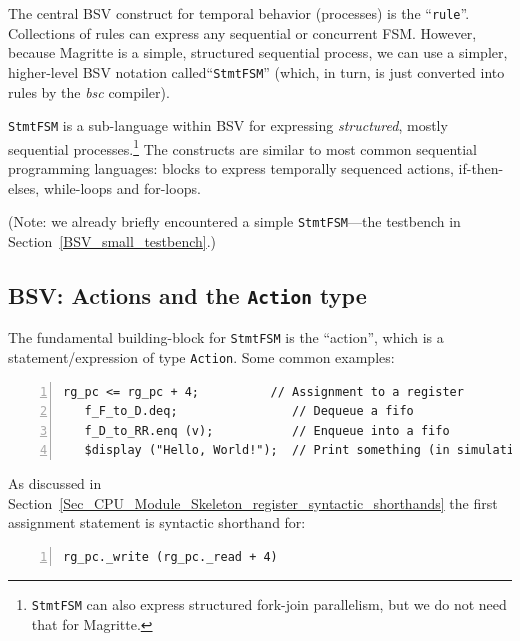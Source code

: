 \label{Sec_FSMs_StmtFSM}


The central BSV construct for temporal behavior (processes) is the
``\verb|rule|''.  Collections of rules can express any sequential or
concurrent FSM.  However, because Magritte is a simple, structured
sequential process, we can use a simpler, higher-level BSV notation
called``\verb|StmtFSM|'' (which, in turn, is just converted into rules
by the \emph{bsc} compiler).

\verb|StmtFSM| is a sub-language within BSV for expressing
\emph{structured}, mostly sequential processes.\footnote{{\tt StmtFSM}
can also express structured fork-join parallelism, but we do not need
that for Magritte.}  The constructs are similar to most common
sequential programming languages: blocks to express temporally
sequenced actions, if-then-elses, while-loops and for-loops.

(Note: we already briefly encountered a simple \verb|StmtFSM|---the
testbench in Section~\ref{BSV_small_testbench}.)


\subsection{BSV: Actions and the {\tt Action} type}


The fundamental building-block for \verb|StmtFSM| is the ``action'',
which is a statement/expression of type \verb|Action|.  Some common
examples:

\begin{Verbatim}[frame=single, numbers=left]
   rg_pc <= rg_pc + 4;          // Assignment to a register
   f_F_to_D.deq;                // Dequeue a fifo
   f_D_to_RR.enq (v);           // Enqueue into a fifo
   $display ("Hello, World!");  // Print something (in simulation only)
\end{Verbatim}

As discussed in
Section~\ref{Sec_CPU_Module_Skeleton_register_syntactic_shorthands}
the first assignment statement is syntactic shorthand for:

\begin{Verbatim}[frame=single, numbers=left]
   rg_pc._write (rg_pc._read + 4)
\end{Verbatim}

